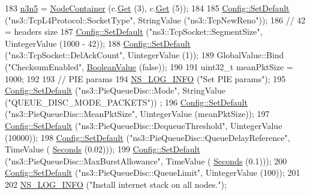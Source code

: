 \begin{DoxyCode}
183   \hyperlink{pie-example_8cc_af4c498a2bfb720685107e00e03067e31}{n3n5} = \hyperlink{classns3_1_1NodeContainer}{NodeContainer} (c.\hyperlink{classns3_1_1NodeContainer_a9ed96e2ecc22e0f5a3d4842eb9bf90bf}{Get} (3), c.\hyperlink{classns3_1_1NodeContainer_a9ed96e2ecc22e0f5a3d4842eb9bf90bf}{Get} (5));
184 
185   \hyperlink{group__config_ga2e7882df849d8ba4aaad31c934c40c06}{Config::SetDefault} (\textcolor{stringliteral}{"ns3::TcpL4Protocol::SocketType"}, StringValue (\textcolor{stringliteral}{"ns3::TcpNewReno"}));
186   \textcolor{comment}{// 42 = headers size}
187   \hyperlink{group__config_ga2e7882df849d8ba4aaad31c934c40c06}{Config::SetDefault} (\textcolor{stringliteral}{"ns3::TcpSocket::SegmentSize"}, UintegerValue (1000 - 42));
188   \hyperlink{group__config_ga2e7882df849d8ba4aaad31c934c40c06}{Config::SetDefault} (\textcolor{stringliteral}{"ns3::TcpSocket::DelAckCount"}, UintegerValue (1));
189   GlobalValue::Bind (\textcolor{stringliteral}{"ChecksumEnabled"}, \hyperlink{classns3_1_1BooleanValue}{BooleanValue} (\textcolor{keyword}{false}));
190 
191   uint32\_t meanPktSize = 1000;
192 
193   \textcolor{comment}{// PIE params}
194   \hyperlink{group__logging_gafbd73ee2cf9f26b319f49086d8e860fb}{NS\_LOG\_INFO} (\textcolor{stringliteral}{"Set PIE params"});
195   \hyperlink{group__config_ga2e7882df849d8ba4aaad31c934c40c06}{Config::SetDefault} (\textcolor{stringliteral}{"ns3::PieQueueDisc::Mode"}, StringValue (\textcolor{stringliteral}{"QUEUE\_DISC\_MODE\_PACKETS"}))
      ;
196   \hyperlink{group__config_ga2e7882df849d8ba4aaad31c934c40c06}{Config::SetDefault} (\textcolor{stringliteral}{"ns3::PieQueueDisc::MeanPktSize"}, UintegerValue (meanPktSize));
197   \hyperlink{group__config_ga2e7882df849d8ba4aaad31c934c40c06}{Config::SetDefault} (\textcolor{stringliteral}{"ns3::PieQueueDisc::DequeueThreshold"}, UintegerValue (10000));
198   \hyperlink{group__config_ga2e7882df849d8ba4aaad31c934c40c06}{Config::SetDefault} (\textcolor{stringliteral}{"ns3::PieQueueDisc::QueueDelayReference"}, TimeValue (
      \hyperlink{group__timecivil_ga33c34b816f8ff6628e33d5c8e9713b9e}{Seconds} (0.02)));
199   \hyperlink{group__config_ga2e7882df849d8ba4aaad31c934c40c06}{Config::SetDefault} (\textcolor{stringliteral}{"ns3::PieQueueDisc::MaxBurstAllowance"}, TimeValue (
      \hyperlink{group__timecivil_ga33c34b816f8ff6628e33d5c8e9713b9e}{Seconds} (0.1)));
200   \hyperlink{group__config_ga2e7882df849d8ba4aaad31c934c40c06}{Config::SetDefault} (\textcolor{stringliteral}{"ns3::PieQueueDisc::QueueLimit"}, UintegerValue (100));
201 
202   \hyperlink{group__logging_gafbd73ee2cf9f26b319f49086d8e860fb}{NS\_LOG\_INFO} (\textcolor{stringliteral}{"Install internet stack on all nodes."});

\end{DoxyCode}
